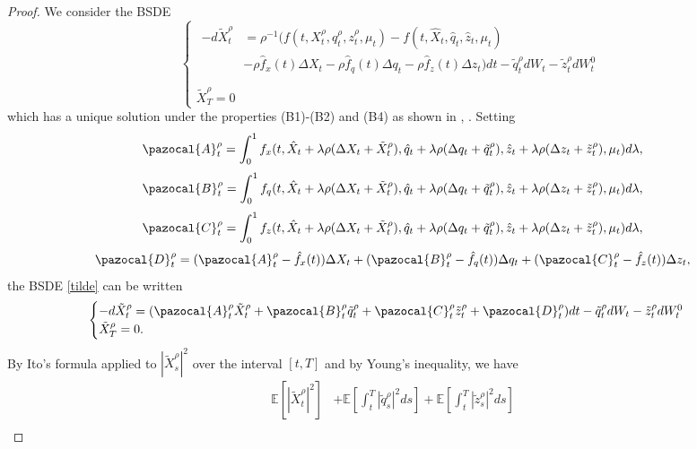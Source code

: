 \documentclass[11pt,a4paper]{article}
\newcommand{\Ab}{\pazocal{A}}
\newcommand{\Bb}{\pazocal{B}}
\newcommand{\Cb}{\pazocal{C}}
\newcommand{\Db}{\pazocal{D}}
\begin{document}
\begin{proof} We consider the BSDE 
\begin{equation}
\label{tilde}
\begin{cases}
\begin{aligned}
    -d\tilde{X}_t^\rho &= \rho^{-1}(f(t, X_t^\rho,  q_t^\rho, z_t^\rho, \mu_t)-f(t, \hat X_t, \hat q_t, \hat z_t, \mu_t)\\
    &-\rho \hat f_x(t)\Delta{X}_t-\rho \hat f_q(t)\Delta{q}_t-\rho \hat f_z(t)\Delta{z}_t )dt-\tilde{q}_t^\rho dW_t-\tilde{z}_t^\rho dW_t^0\\
\end{aligned}\\
    \tilde{X}_T^ \rho=0
\end{cases}
\end{equation} 
which has a unique solution under the properties (B1)-(B2) and (B4) as shown in \cite{Karoui Peng Quenez}, \cite{Pardoux}.  
Setting
$$\Ab_t^\rho=\int_0^1 f_x(t, \hat X_t+\lambda\rho(\Delta{X}_t+\tilde{X}_t^\rho), \hat q_t+\lambda\rho(\Delta{q}_t+\tilde{q}_t^\rho), \hat z_t+\lambda\rho(\Delta{z}_t+\tilde{z}_t^\rho), \mu_t)d \lambda,$$
$$\Bb_t^\rho=\int_0^1 f_q(t, \hat X_t+\lambda\rho(\Delta{X}_t+\tilde{X}_t^\rho),  \hat q_t+\lambda\rho(\Delta{q}_t+\tilde{q}_t^\rho), \hat z_t+\lambda\rho(\Delta{z}_t+\tilde{z}_t^\rho), \mu_t )d \lambda,$$
$$\Cb_t^\rho=\int_0^1 f_z(t, \hat X_t+\lambda\rho(\Delta{X}_t+\tilde{X}_t^\rho), \hat q_t+\lambda\rho(\Delta{q}_t+\tilde{q}_t^\rho), \hat z_t+\lambda\rho(\Delta{z}_t+\tilde{z}_t^\rho), \mu_t)d \lambda,$$
\begin{equation}
\label{D}
    \Db_t^\rho=(\Ab_t^\rho- \hat f_x(t))\Delta {X}_t+(\Bb_t^\rho- \hat f_q(t))\Delta{q}_t+(\Cb_t^\rho- \hat f_z(t))\Delta{z}_t,
\end{equation}
the BSDE \eqref{tilde} can be written 
\begin{equation*}
\begin{cases}
 -d\tilde{X}_t^\rho =(\Ab_t^\rho \tilde{X}_t^\rho+\Bb_t^\rho \tilde{q}_t^\rho+\Cb_t^\rho \tilde{z}_t^\rho+ \Db_t^\rho )dt-\tilde{q}_t^\rho dW_t-\tilde{z}_t^\rho dW_t^0\\
\tilde{X}_T^ \rho=0.
\end{cases}
\end{equation*}  
By Ito's formula applied to $|\tilde{X}_s^\rho|^2$ over the interval $[t,T]$ and by Young's inequality, we have
\begin{align*}
    \mathbb E\left[|\tilde{X}_t^\rho|^2\right]&+\mathbb E \left[\int_t^T |\tilde{q}_s^\rho|^2ds \right] +\mathbb E \left[\int_t^T |\tilde{z}_s^\rho|^2ds\right]\\

\end{align*}
\end{proof}
\end{document}
